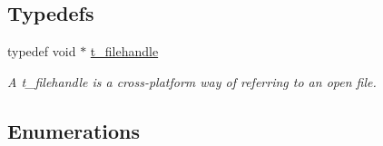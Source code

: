 \subsection*{Typedefs}
\begin{DoxyCompactItemize}
\item 
typedef void $\ast$ \hyperlink{group__files_gafcb776aa74d514754e83b30995b5a5d1}{t\_\-filehandle}
\begin{DoxyCompactList}\small\item\em A t\_\-filehandle is a cross-\/platform way of referring to an open file. \item\end{DoxyCompactList}\end{DoxyCompactItemize}
\subsection*{Enumerations}

